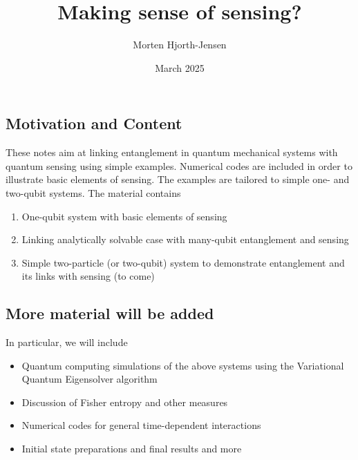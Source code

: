 \documentclass[%
oneside,                 %
final,                   %
10pt]{article}
\begin{document}

\newcommand{\exercisesection}[1]{\subsection*{#1}}






\title{Making sense of sensing? }


\author{Morten Hjorth-Jensen}

\date{March 2025
}

\subsection{Motivation and Content}

These notes aim at linking entanglement in quantum mechanical systems
with quantum sensing using simple examples.  Numerical codes are
included in order to illustrate basic elements of sensing.  The
examples are tailored to simple one- and two-qubit systems. The
material contains
\begin{enumerate}
\item One-qubit system with basic elements of sensing

\item Linking analytically solvable case with many-qubit entanglement and sensing

\item Simple two-particle (or two-qubit) system to demonstrate entanglement and its links with sensing (to come)
\end{enumerate}

\noindent
\subsection{More material will be added}

In particular, we will include
\begin{itemize}
\item Quantum computing simulations of the above systems using the Variational Quantum Eigensolver algorithm

\item Discussion of Fisher entropy and other measures

\item Numerical codes for general time-dependent interactions

\item Initial state preparations and final results and more
\end{itemize}
\end{document}
